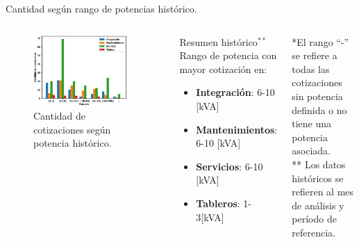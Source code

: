 \documentclass[aspectratio=169,xcolor=dvipsnames]{beamer}
\begin{document}

\begin{frame}{Cantidad según rango de potencias histórico.}

\begin{columns}[c]
\begin{figure}
     \includegraphics[width=0.9\textwidth]{EPS/potencia_historico.eps}
     \caption{Cantidad de cotizaciones según potencia histórico.}
     \label{graph:cantidad_cotizaciones_historia}
\end{figure}
 \begin{block}{Resumen histórico$^{**}$}
    Rango de potencia con mayor cotización en:
     \begin{itemize}
         \item \textbf{Integración}: 6-10 [kVA]
         \item \textbf{Mantenimientos}: 6-10 [kVA]
         \item \textbf{Servicios}: 6-10 [kVA]
         \item \textbf{Tableros}: 1-3[kVA]
     \end{itemize}
\end{block}
\begin{block}{}
    \tiny{*El rango ``-'' se refiere a todas las cotizaciones sin potencia definida o no tiene una potencia asociada.\\
    ** Los datos históricos se refieren al mes de análisis y período de referencia.}
\end{block} 
\end{columns}
    
\end{frame}
\end{document}
